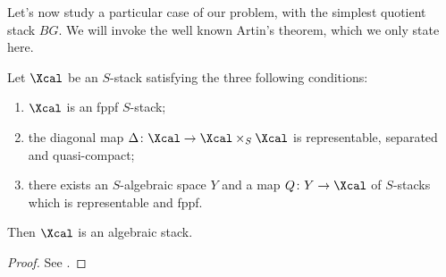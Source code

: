             Let's now study a particular case of our problem, with the simplest quotient stack $BG$. We will invoke the well known Artin's theorem, which we only state here.
            \begin{thm}
                \label{thm:artin_rep_alg_stacks}
                Let $\Xcal$ be an $S$-stack satisfying the three following conditions:
                \begin{enumerate}[label=(\arabic*)]
                    \item $\Xcal$ is an fppf $S$-stack;
                    \item the diagonal map $\Delta\colon \Xcal \to \Xcal \times_S \Xcal$ is representable, separated and quasi-compact;
                    \item there exists an $S$-algebraic space $Y$ and a map $Q\colon Y \to \Xcal$ of $S$-stacks which is representable and fppf.
                \end{enumerate}
                Then $\Xcal$ is an algebraic stack.
            \end{thm}
            \begin{proof}
                See \cite[Thm~10.1]{lmb00}.
            \end{proof}

